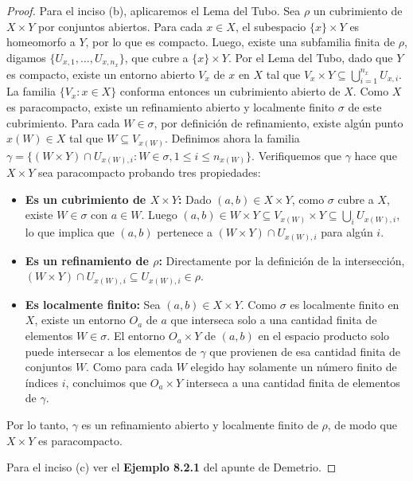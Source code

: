 \documentclass{article}
\theoremstyle{plain}
\theoremstyle{definition}
\begin{document}
\begin{proof}
    Para el inciso (b), aplicaremos el Lema del Tubo. Sea \( \rho \) un cubrimiento de \( X \times Y \) por conjuntos abiertos.
    Para cada \( x \in X \), el subespacio \( \{x\} \times Y \) es homeomorfo a \( Y \), por lo que es compacto. Luego, existe una subfamilia finita de \( \rho \), digamos \( \{ U_{x,1}, \dots, U_{x,n_x} \} \), que cubre a \( \{x\} \times Y \).
    Por el Lema del Tubo, dado que \( Y \) es compacto, existe un entorno abierto \( V_x \) de \( x \) en \( X \) tal que \( V_x \times Y \subseteq \bigcup_{i=1}^{n_x} U_{x,i} \).
    La familia \( \{ V_x : x \in X \} \) conforma entonces un cubrimiento abierto de \( X \). Como \( X \) es paracompacto, existe un refinamiento abierto y localmente finito \( \sigma \) de este cubrimiento.
    Para cada \( W \in \sigma \), por definición de refinamiento, existe algún punto \( x(W) \in X \) tal que \( W \subseteq V_{x(W)} \).
    Definimos ahora la familia \( \gamma = \{ (W \times Y) \cap U_{x(W),i} : W \in \sigma, 1 \leq i \leq n_{x(W)} \} \). Verifiquemos que \( \gamma \) hace que \( X \times Y \) sea paracompacto probando tres propiedades:
    \begin{itemize}
        \item \textbf{Es un cubrimiento de \( X \times Y \):} Dado \( (a,b) \in X \times Y \), como \( \sigma \) cubre a \( X \), existe \( W \in \sigma \) con \( a \in W \). Luego \( (a,b) \in W \times Y \subseteq V_{x(W)} \times Y \subseteq \bigcup_{i} U_{x(W),i} \), lo que implica que \( (a,b) \) pertenece a \( (W \times Y) \cap U_{x(W),i} \) para algún \( i \).
        \item \textbf{Es un refinamiento de \( \rho \):} Directamente por la definición de la intersección, \( (W \times Y) \cap U_{x(W),i} \subseteq U_{x(W),i} \in \rho \).
        \item \textbf{Es localmente finito:} Sea \( (a,b) \in X \times Y \). Como \( \sigma \) es localmente finito en \( X \), existe un entorno \( O_a \) de \( a \) que interseca solo a una cantidad finita de elementos \( W \in \sigma \). El entorno \( O_a \times Y \) de \( (a,b) \) en el espacio producto solo puede intersecar a los elementos de \( \gamma \) que provienen de esa cantidad finita de conjuntos \( W \). Como para cada \( W \) elegido hay solamente un número finito de índices \( i \), concluimos que \( O_a \times Y \) interseca a una cantidad finita de elementos de \( \gamma \).
    \end{itemize}
    Por lo tanto, \( \gamma \) es un refinamiento abierto y localmente finito de \( \rho \), de modo que \( X \times Y \) es paracompacto.

    Para el inciso (c) ver el \textbf{Ejemplo 8.2.1} del apunte de Demetrio.
\end{proof}
\end{document}
